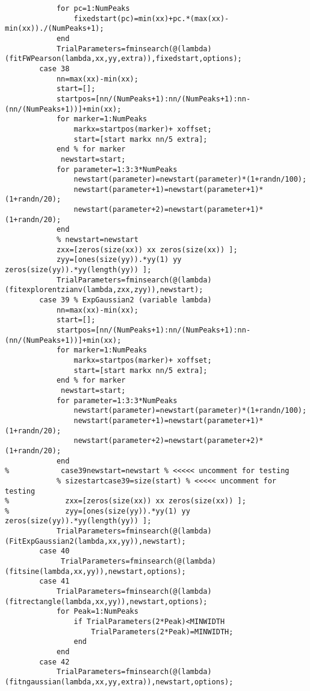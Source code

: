 \begin{lstlisting}
            for pc=1:NumPeaks
                fixedstart(pc)=min(xx)+pc.*(max(xx)-min(xx))./(NumPeaks+1);
            end            
            TrialParameters=fminsearch(@(lambda)(fitFWPearson(lambda,xx,yy,extra)),fixedstart,options);
        case 38
            nn=max(xx)-min(xx);
            start=[];
            startpos=[nn/(NumPeaks+1):nn/(NumPeaks+1):nn-(nn/(NumPeaks+1))]+min(xx);
            for marker=1:NumPeaks
                markx=startpos(marker)+ xoffset;
                start=[start markx nn/5 extra];
            end % for marker
             newstart=start;
            for parameter=1:3:3*NumPeaks
                newstart(parameter)=newstart(parameter)*(1+randn/100);
                newstart(parameter+1)=newstart(parameter+1)*(1+randn/20);
                newstart(parameter+2)=newstart(parameter+1)*(1+randn/20);
            end
            % newstart=newstart
            zxx=[zeros(size(xx)) xx zeros(size(xx)) ];
            zyy=[ones(size(yy)).*yy(1) yy zeros(size(yy)).*yy(length(yy)) ];
            TrialParameters=fminsearch(@(lambda)(fitexplorentzianv(lambda,zxx,zyy)),newstart);
        case 39 % ExpGaussian2 (variable lambda)
            nn=max(xx)-min(xx);
            start=[];
            startpos=[nn/(NumPeaks+1):nn/(NumPeaks+1):nn-(nn/(NumPeaks+1))]+min(xx);
            for marker=1:NumPeaks
                markx=startpos(marker)+ xoffset;
                start=[start markx nn/5 extra];
            end % for marker
             newstart=start;
            for parameter=1:3:3*NumPeaks
                newstart(parameter)=newstart(parameter)*(1+randn/100);
                newstart(parameter+1)=newstart(parameter+1)*(1+randn/20);
                newstart(parameter+2)=newstart(parameter+2)*(1+randn/20);
            end
%            case39newstart=newstart % <<<<< uncomment for testing
            % sizestartcase39=size(start) % <<<<< uncomment for testing
%             zxx=[zeros(size(xx)) xx zeros(size(xx)) ];
%             zyy=[ones(size(yy)).*yy(1) yy zeros(size(yy)).*yy(length(yy)) ];
            TrialParameters=fminsearch(@(lambda)(FitExpGaussian2(lambda,xx,yy)),newstart);
        case 40
             TrialParameters=fminsearch(@(lambda)(fitsine(lambda,xx,yy)),newstart,options); 
        case 41
            TrialParameters=fminsearch(@(lambda)(fitrectangle(lambda,xx,yy)),newstart,options);
            for Peak=1:NumPeaks
                if TrialParameters(2*Peak)<MINWIDTH
                    TrialParameters(2*Peak)=MINWIDTH;
                end
            end
        case 42
            TrialParameters=fminsearch(@(lambda)(fitngaussian(lambda,xx,yy,extra)),newstart,options);

\end{lstlisting}
